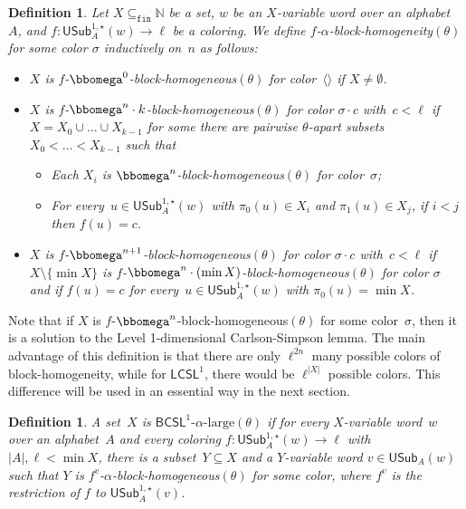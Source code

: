 \documentclass{article}
\numberwithin{theorem}{section}
\newtheorem{definition}[theorem]{Definition}
\newcommand{\RFCSL}{\mathsf{LCSL}}
\newcommand{\NN}{\mathbb{N}}
\newcommand{\USub}{\mathsf{USub}}
\newcommand{\BCSL}{\mathsf{BCSL}}
\newcommand{\BlockCSL}[1]{\BCSL^1\text{-}#1\text{-large}(\theta)}
\newcommand{\finsub}{\subseteq_{\mathtt{fin}}}
\begin{document}
\begin{definition}
Let $X \finsub \NN$ be a set, $w$ be an $X$-variable word over an alphabet~$A$,
and $f : \USub^{1,\star}_A(w) \to \ell$ be a coloring. We define $f$-$\alpha$-block-homogeneity$(\theta)$ for some color $\sigma$ inductively on~$n$ as follows:
\begin{itemize}
    \item $X$ is $f$-$\bbomega^0$-block-homogeneous$(\theta)$ for color~$\langle \rangle$ if $X \neq \emptyset$.
    \item $X$ is $f$-$\bbomega^n\cdot k$-block-homogeneous$(\theta)$ for color $\sigma \cdot c$ with~$c < \ell$ if $X = X_0 \cup \dots \cup X_{k-1}$ for some there are pairwise $\theta$-apart subsets $X_0 < \dots < X_{k-1}$ such that 
    \begin{itemize}
        \item Each $X_i$ is $\bbomega^n$-block-homogeneous$(\theta)$ for color~$\sigma$;
        \item For every~$u \in \USub^{1,\star}_A(w)$ with $\pi_0(u) \in X_i$ and $\pi_1(u) \in X_j$, if $i < j$ then $f(u) = c$.
    \end{itemize}    
    \item $X$ is $f$-$\bbomega^{n+1}$-block-homogeneous$(\theta)$ for color $\sigma \cdot c$ with~$c < \ell$ if $X \setminus \{\min X\}$ is $f$-$\bbomega^n\cdot (\min X)$-block-homogeneous$(\theta)$ for color $\sigma$ and if $f(u) = c$ for every~$u \in \USub^{1,\star}_A(w)$ with $\pi_0(u) = \min X$.
\end{itemize}
\end{definition}

Note that if $X$ is $f$-$\bbomega^n$-block-homogeneous$(\theta)$ for some color~$\sigma$, then it is a solution to the Level 1-dimensional Carlson-Simpson lemma. The main advantage of this definition is that there are only $\ell^{2n}$ many possible colors of block-homogeneity, while for $\RFCSL^1$, there would be $\ell^{|X|}$ possible colors. This difference will be used in an essential way in the next section. 

\begin{definition}
A set~$X$ is $\BlockCSL{\alpha}$ if for every $X$-variable word~$w$ over an alphabet~$A$ and every coloring $f : \USub^{1,\star}_A(w) \to \ell$ with $|A|, \ell < \min X$, there is a subset~$Y \subseteq X$ and a $Y$-variable word $v \in \USub_A(w)$ such that $Y$ is $f^v$-$\alpha$-block-homogeneous$(\theta)$ for some color, where $f^v$ is the restriction of $f$ to $\USub^{1,\star}_A(v)$.
\end{definition}
\end{document}
